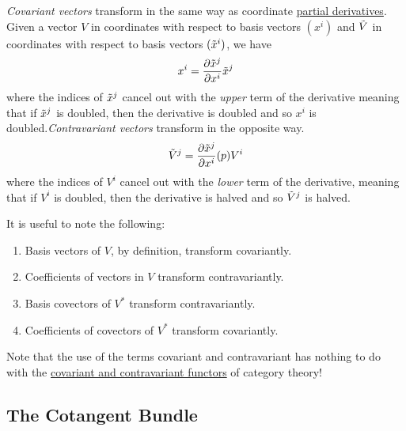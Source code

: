 \documentclass{article}
\newcounter{theorem}[section]
\newcounter{definition}[section]
\begin{document}
      \begin{definition}
        \label{def:covariant-and-contravariant-vectors}
      \textit{Covariant vectors} transform in the same way as coordinate \hyperref[mv-def:partial-derivative]{partial derivatives}. Given a vector $V$ in coordinates with respect to basis vectors $(x^i)$ and $\Tilde{V}$ in coordinates with respect to basis vectors $(\Tilde{x}^i)$, we have
      \begin{equation}
        x^i = \frac{\partial \Tilde{x}^j}{\partial x^i} \Tilde{x}^j
      \end{equation}
      where the indices of $\Tilde{x}^j$ cancel out with the \textit{upper} term of the derivative meaning that if $\Tilde{x}^j$ is doubled, then the derivative is doubled and so $x^i$ is doubled.\textit{Contravariant vectors} transform in the opposite way. 
      \begin{equation}
        \Tilde{V}^j = \frac{\partial \Tilde{x}^j}{\partial x^i} (p) V^i
      \end{equation}
      where the indices of $V^i$ cancel out with the \textit{lower} term of the derivative, meaning that if $V^i$ is doubled, then the derivative is halved and so $\Tilde{V}^j$ is halved. 
      \end{definition}

      \begin{theorem}
        \label{thm:which-objects-transform-covariantly}
      It is useful to note the following:
      \begin{enumerate}
          \item Basis vectors of $V$, by definition, transform covariantly. 
          \item Coefficients of vectors in $V$ transform contravariantly. 
          \item Basis covectors of $V^*$ transform contravariantly. 
          \item Coefficients of covectors of $V^*$ transform covariantly. 
      \end{enumerate}
      \end{theorem}

      Note that the use of the terms covariant and contravariant has nothing to do with the \hyperref[cat-def:covariant-and-contravariant-functors]{covariant and contravariant functors} of category theory! 

  \subsection{The Cotangent Bundle}
\end{document}
